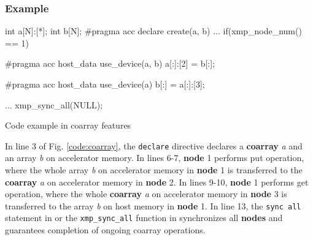\subsubsection*{Example}
\begin{myfigure}
\begin{minipage}{0.45\hsize}
\begin{center}
\end{center}
\end{minipage}
%
\begin{minipage}{0.53\hsize}
\begin{center}
\begin{XACCCexampleR}
int a[N]:[*];
int b[N];
#pragma acc declare create(a, b)
...
if(xmp_node_num() == 1){
#pragma acc host_data use_device(a, b)
  a[:]:[2] = b[:];

#pragma acc host_data use_device(a)
  b[:] = a[:]:[3];
}
...
xmp_sync_all(NULL);
\end{XACCCexampleR}
\end{center}
\end{minipage}
\caption{Code example in coarray features}\label{code:coarray}
\end{myfigure}

In line 3 of Fig. \ref{code:coarray},
the {\tt declare} directive declares a {\bf coarray} {\it a} and an array {\it b} on accelerator memory.
In lines 6-7,
{\bf node} 1 performs put operation, where
the whole array {\it b} on accelerator memory in {\bf node} 1 is transferred to the {\bf coarray} {\it a} on accelerator memory in {\bf node} 2.
In lines 9-10,
{\bf node} 1 performs get operation, where
the whole {\bf coarray} {\it a} on accelerator memory in {\bf node} 3 is transferred to the array {\it b} on host memory in {\bf node} 1.
In line 13,
the {\tt sync all} statement in {\XACCF} or the {\tt xmp\_sync\_all} function in {\XACCC} synchronizes all {\bf nodes} and guarantees completion of ongoing coarray operations.

